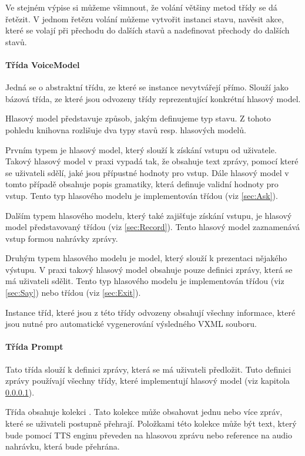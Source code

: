 \documentclass[ing,male,java,dept460]{diploma}						%
\begin{document}
Ve stejném výpise si můžeme všimnout, že volání většiny metod třídy  se dá řetězit. V jednom řetězu volání můžeme vytvořit instanci stavu, navěsit akce, které se volají při přechodu do dalších stavů a nadefinovat přechody do dalších stavů.

\paragraph{Třída VoiceModel}
\label{sec:VoiceModel}
Jedná se o abstraktní třídu, ze které se instance nevytvářejí přímo. Slouží jako bázová třída, ze které jsou odvozeny třídy reprezentující konkrétní hlasový model.

Hlasový model představuje způsob, jakým definujeme typ stavu. Z tohoto pohledu knihovna rozlišuje dva typy stavů resp. hlasových modelů.

Prvním typem je hlasový model, který slouží k získání vstupu od uživatele. Takový hlasový model v praxi vypadá tak, že obsahuje text zprávy, pomocí které se uživateli sdělí, jaké jsou přípustné hodnoty pro vstup. Dále hlasový model v tomto případě obsahuje popis gramatiky, která definuje validní hodnoty pro vstup. Tento typ hlasového modelu je implementován třídou  (viz \ref{sec:Ask}).

Dalším typem hlasového modelu, který také zajišťuje získání vstupu, je hlasový model představovaný třídou  (viz \ref{sec:Record}). Tento hlasový model zaznamenává vstup formou nahrávky zprávy.

Druhým typem hlasového modelu je model, který slouží k prezentaci nějakého výstupu. V praxi takový hlasový model obsahuje pouze definici zprávy, která se má uživateli sdělit. Tento typ hlasového modelu je implementován třídou  (viz \ref{sec:Say}) nebo třídou  (viz \ref{sec:Exit}).

Instance tříd, které jsou z této třídy odvozeny obsahují všechny informace, které jsou nutné pro automatické vygenerování výsledného VXML souboru.

\paragraph{Třída Prompt}
\label{sec:Prompt}
Tato třída slouží k definici zprávy, která se má uživateli předložit. Tuto definici zprávy používají všechny třídy, které implementují hlasový model (viz kapitola \ref{sec:VoiceModel}).

Třída obsahuje kolekci . Tato kolekce může obsahovat jednu nebo více zpráv, které se uživateli postupně přehrají. Položkami této kolekce může být text, který bude pomocí TTS enginu převeden na hlasovou zprávu nebo reference na audio nahrávku, která bude přehrána.
\end{document}
